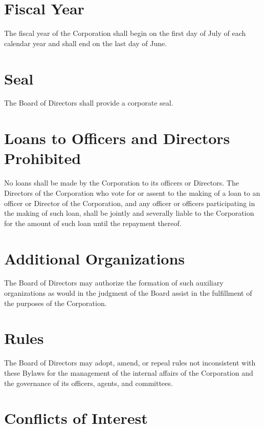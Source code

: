 \section{Fiscal Year}

The fiscal year of the Corporation shall begin on the first day of July of each
calendar year and shall end on the last day of June.

\section{Seal}

The Board of Directors shall provide a corporate seal.

\section{Loans to Officers and Directors Prohibited}

No loans shall be made by the Corporation to its officers or Directors. The
Directors of the Corporation who vote for or assent to the making of a loan to
an officer or Director of the Corporation, and any officer or officers
participating in the making of such loan, shall be jointly and severally liable
to the Corporation for the amount of such loan until the repayment thereof.

\section{Additional Organizations}

The Board of Directors may authorize the formation of such auxiliary
organizations as would in the judgment of the Board assist in the fulfillment
of the purposes of the Corporation.

\section{Rules}

The Board of Directors may adopt, amend, or repeal rules not inconsistent with
these Bylaws for the management of the internal affairs of the Corporation and
the governance of its officers, agents, and committees.

\section{Conflicts of Interest}

